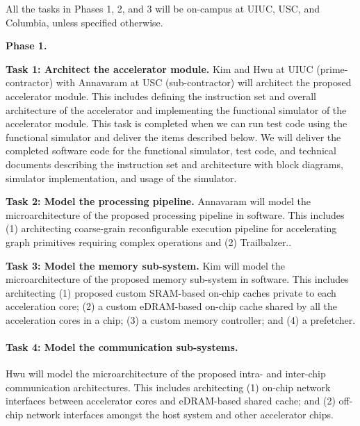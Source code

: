 
\noindent
All the tasks in Phases 1, 2, and 3 will be on-campus at UIUC, USC, and Columbia, unless specified otherwise.

\noindent
\textbf{Phase 1.}

\noindent
\textbf{Task 1: Architect the accelerator module.} 
Kim and Hwu at UIUC (prime-contractor) with Annavaram at USC (sub-contractor) will architect the proposed accelerator module.
This includes defining the instruction set and overall architecture of the accelerator and implementing the functional simulator of the accelerator module.
This task is completed when we can run test code using the functional simulator and deliver the items described below.
We will deliver the completed software code for the functional simulator, test code, and technical documents describing the instruction set and architecture with block diagrams, simulator implementation, and usage of the simulator.


\noindent
\textbf{Task 2: Model the processing pipeline.} 
Annavaram will model the microarchitecture of the proposed processing pipeline in software.
This includes (1) architecting coarse-grain reconfigurable execution pipeline for accelerating graph primitives requiring complex operations and (2) Trailbalzer..

\noindent
\textbf{Task 3: Model the memory sub-system.}
Kim will model the microarchitecture of the proposed memory sub-system in software. 
This includes architecting (1) proposed custom SRAM-based on-chip caches private to each acceleration core; (2) a custom eDRAM-based on-chip cache shared by all the acceleration cores in a chip; (3) a custom memory controller; and (4) a prefetcher.

\noindent
\paragraph{Task 4: Model the communication sub-systems.}
Hwu will model the microarchitecture of the proposed intra- and inter-chip communication architectures. 
This includes architecting (1) on-chip network interfaces between accelerator cores and eDRAM-based shared cache; and (2) off-chip network interfaces amongst the host system and other accelerator chips.


